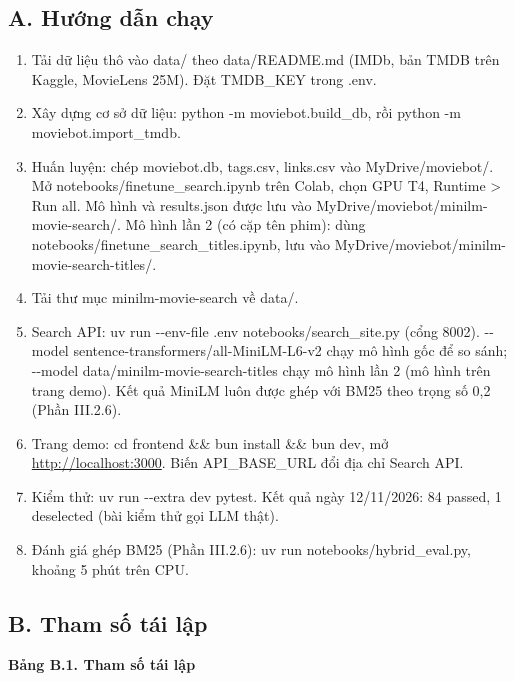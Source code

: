 \documentclass[12pt,a4paper]{article}
\newcommand{\npp}{\Needspace{13\baselineskip}}
\let\oldsubsection\subsection
\renewcommand{\subsection}{\Needspace{12\baselineskip}\oldsubsection}
\begin{document}
\subsection{A. Hướng dẫn chạy}

\begin{enumerate}
\def\labelenumi{\arabic{enumi}.}
\item Tải dữ liệu thô vào data/ theo data/README.md (IMDb, bản TMDB trên Kaggle, MovieLens 25M). Đặt TMDB\_KEY trong .env.
\item Xây dựng cơ sở dữ liệu: python -m moviebot.build\_\allowbreak db, rồi python -m moviebot.\allowbreak import\_\allowbreak tmdb.
\item Huấn luyện: chép moviebot.db, tags.csv, links.csv vào MyDrive/moviebot/. Mở notebooks/finetune\_search.ipynb trên Colab, chọn GPU T4, Runtime \textgreater{} Run all. Mô hình và results.json được lưu vào MyDrive/moviebot/minilm-movie-search/. Mô hình lần 2 (có cặp tên phim): dùng notebooks/finetune\_search\_titles.ipynb, lưu vào MyDrive/moviebot/minilm-movie-search-titles/.
\item Tải thư mục minilm-movie-search về data/.
\item Search API: uv run -\/-env-file .env notebooks/search\_site.py (cổng 8002). -\/-model sentence-transformers/all-MiniLM-L6-v2 chạy mô hình gốc để so sánh; -\/-model data/minilm-movie-search-titles chạy mô hình lần 2 (mô hình trên trang demo). Kết quả MiniLM luôn được ghép với BM25 theo trọng số 0,2 (Phần III.2.6).
\item Trang demo: cd frontend \&\& bun install \&\& bun dev, mở \href{http://localhost:3000/}{http://localhost:3000}. Biến API\_BASE\_URL đổi địa chỉ Search API.
\item Kiểm thử: uv run -\/-extra dev pytest. Kết quả ngày 12/11/2026: 84 passed, 1 deselected (bài kiểm thử gọi LLM thật).
\item Đánh giá ghép BM25 (Phần III.2.6): uv run notebooks/hybrid\_eval.py, khoảng 5 phút trên CPU.
\end{enumerate}

\subsection{B. Tham số tái lập}

\npp\textbf{Bảng B.1. Tham số tái lập}
\end{document}
